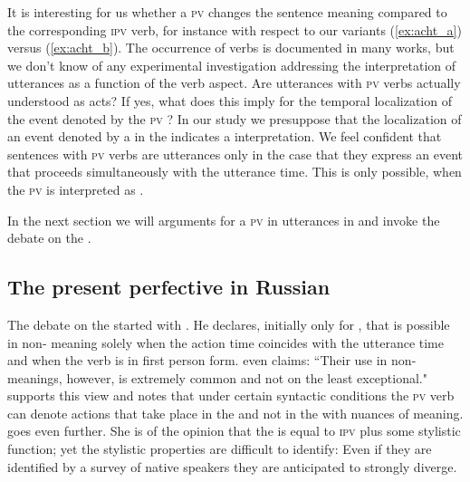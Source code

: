 \documentclass[output=paper,colorlinks,citecolor=brown,newtxmath,hidelinks]{langscibook}
\begin{document}
It is interesting for us whether a \textsc{pv}  changes the sentence meaning compared to the corresponding \textsc{ipv} verb, for instance with respect to our variants (\ref{ex:acht_a}) versus (\ref{ex:acht_b}). The occurrence of    verbs is documented in many works, but we don't know of any experimental investigation addressing the interpretation of  utterances as a function of the verb aspect. Are utterances with \textsc{pv}  verbs actually understood as  acts? If yes, what does this imply for the temporal localization of the event denoted by the \textsc{pv} ? In our study we presuppose that the localization of an event denoted by a  in the  indicates a  interpretation. We feel confident that sentences with \textsc{pv}  verbs are  utterances only in the case that they express an event that proceeds simultaneously with the utterance time. This is only possible, when the \textsc{pv}  is interpreted as  .  

In the next section we will  arguments for a \textsc{pv} in  utterances in  and invoke the debate on the  .

\subsection{The present perfective in Russian}\label{sub:eins:4}

The debate on the   started with \citet{Koschmieder1929}. He declares, initially only for , that   is possible in non- meaning solely when the action time coincides with the utterance time and when the verb is in first person form. \citet[120]{Forsyth1970} even claims: “Their use in non- meanings, however, is extremely common and not on the least exceptional." \citet{Svedova1980} supports this view and notes that under certain syntactic conditions the \textsc{pv} verb can denote actions that take place in the  and not in the  with nuances of meaning. \citet{Rathmayr1976} goes even further. She is of the opinion that the   is equal to \textsc{ipv}  plus some stylistic function; yet the stylistic properties are difficult to identify: Even if they are identified by a survey of native speakers they are anticipated to strongly diverge. 
\end{document}
